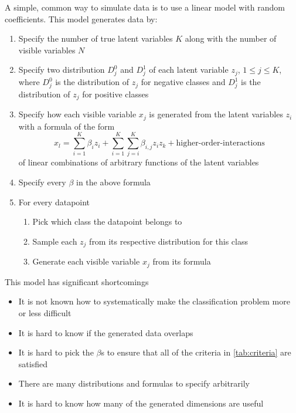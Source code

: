 \documentclass{article}
\begin{document}
A simple, common way to simulate data is to use a linear model with random
coefficients. This model generates data by:
\begin{enumerate}
    \item Specify the number of true latent variables $K$ along with the number
        of visible variables $N$
    \item Specify two distribution $D_j^0$ and $D_j^1$ of each latent variable
        $z_j$, $1 \leq j \leq K$, where $D_j^0$ is the distribution of $z_j$
        for negative classes and $D_j^1$ is the distribution of $z_j$ for
        positive classes
    \item Specify how each visible variable $x_j$ is generated from the latent
        variables $z_i$ with a formula of the form
        $$
        x_l
        = \sum_{i=1}^K \beta_i z_i
        + \sum_{i=1}^K\sum_{j=i}^K \beta_{i,j} z_i z_k
        + \text{higher-order-interactions}
        $$
        of linear combinations of arbitrary functions of the latent variables
    \item Specify every $\beta$ in the above formula
    \item For every datapoint
    \begin{enumerate}
        \item Pick which class the datapoint belongs to
        \item Sample each $z_j$ from its respective distribution for this class
        \item Generate each visible variable $x_j$ from its formula
    \end{enumerate}
\end{enumerate}

This model has significant shortcomings
\begin{itemize}
    \item It is not known how to systematically make the classification problem
        more or less difficult
    \item It is hard to know if the generated data overlaps
    \item It is hard to pick the $\beta$s to ensure that all of the criteria in
        \ref{tab:criteria} are satisfied
    \item There are many distributions and formulas to specify arbitrarily
    \item It is hard to know how many of the generated dimensions are useful
\end{itemize}
\end{document}
